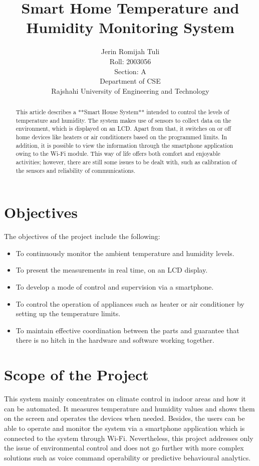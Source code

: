 \documentclass[a4paper,12pt]{article}
\title{\textbf{Smart Home Temperature and Humidity Monitoring System}}
\author{Jerin Romijah Tuli \\ 
Roll: 2003056 \\ 
Section: A \\ 
Department of CSE \\ 
Rajshahi University of Engineering and Technology}
\begin{document}
\maketitle

\begin{abstract}
 This article describes a **Smart House System** intended to control the levels of temperature and humidity. The system makes use of sensors to collect data on the environment, which is displayed on an LCD. Apart from that, it switches on or off home devices like heaters or air conditioners based on the programmed limits. In addition, it is possible to view the information through the smartphone application owing to the Wi-Fi module. This way of life offers both comfort and enjoyable activities; however, there are still some issues to be dealt with, such as calibration of the sensors and reliability of communications.
\end{abstract}

\section{Objectives}
The objectives of the project include the following: 
\begin{itemize}
    \item To continuously monitor the ambient temperature and humidity levels.
    \item To present the measurements in real time, on an LCD display.
    \item To develop a mode of control and supervision via a smartphone.
    \item To control the operation of appliances such as heater or air conditioner by setting up the temperature limits.
    \item To maintain effective coordination between the parts and guarantee that there is no hitch in the hardware and software working together.
\end{itemize}

\section{Scope of the Project}
This system mainly concentrates on climate control in indoor areas and how it can be automated. It measures temperature and humidity values and shows them on the screen and operates the devices when needed. Besides, the users can be able to operate and monitor the system via a smartphone application which is connected to the system through Wi-Fi. Nevertheless, this project addresses only the issue of environmental control and does not go further with more complex solutions such as voice command operability or predictive behavioural analytics.
\end{document}
